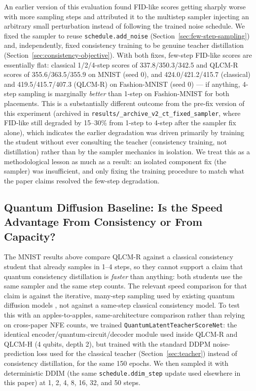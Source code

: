 \documentclass[11pt]{article}
\begin{document}
An earlier version of this evaluation found FID-like scores getting sharply
worse with more sampling steps and attributed it to the multistep sampler
injecting an arbitrary small perturbation instead of following the trained
noise schedule. We fixed the sampler to reuse \texttt{schedule.add\_noise}
(Section~\ref{sec:few-step-sampling}) and, independently, fixed consistency
training to be genuine teacher distillation (Section~\ref{sec:consistency-objective}).
With both fixes, few-step FID-like scores are essentially flat: classical
1/2/4-step scores of 337.8/350.3/342.5 and QLCM-R scores of
355.6/363.5/355.9 on MNIST (seed 0), and 424.0/421.2/415.7 (classical) and
419.5/415.7/407.3 (QLCM-R) on Fashion-MNIST (seed 0) --- if anything, 4-step
sampling is marginally \emph{better} than 1-step on Fashion-MNIST for both
placements. This is a substantially different outcome from the pre-fix
version of this experiment (archived in
\texttt{results/\_archive\_v2\_ct\_fixed\_sampler}, where FID-like still
degraded by 15--30\% from 1-step to 4-step after the sampler fix alone), which
indicates the earlier degradation was driven primarily by training the
student without ever consulting the teacher (consistency training, not
distillation) rather than by the sampler mechanics in isolation. We treat
this as a methodological lesson as much as a result: an isolated component
fix (the sampler) was insufficient, and only fixing the training procedure to
match what the paper claims resolved the few-step degradation.

\subsection{Quantum Diffusion Baseline: Is the Speed Advantage From Consistency or From Capacity?}
\label{sec:quantum-diffusion-baseline}

The MNIST results above compare QLCM-R against a classical consistency
student that already samples in 1--4 steps, so they cannot support a claim
that quantum consistency distillation is \emph{faster} than anything: both
students use the same sampler and the same step counts. The relevant speed
comparison for that claim is against the iterative, many-step sampling used
by existing quantum diffusion models \citep{zhang2023quddpm,kwun2024mixedquddpm,kolle2024qddm}, not against a same-step classical
consistency model. To test this with an apples-to-apples, same-architecture
comparison rather than relying on cross-paper NFE counts, we trained
\texttt{QuantumLatentTeacherScoreNet}: the identical encoder/quantum-circuit/decoder
module used inside QLCM-R and QLCM-H (4 qubits, depth 2), but trained with the
standard DDPM noise-prediction loss used for the classical teacher
(Section~\ref{sec:teacher}) instead of consistency
distillation, for the same 150 epochs. We then sampled it with deterministic
DDIM (the same \texttt{schedule.ddim\_step} update used elsewhere in this
paper) at 1, 2, 4, 8, 16, 32, and 50 steps.
\end{document}
